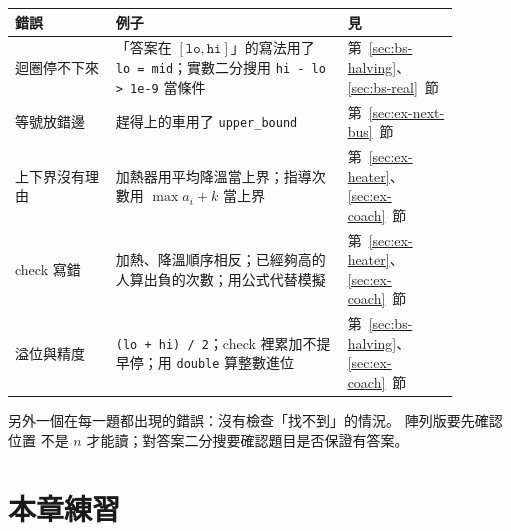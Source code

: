 \begin{center}
\begin{tabular}{p{0.2\linewidth}p{0.46\linewidth}p{0.22\linewidth}}
\toprule
錯誤 & 例子 & 見 \\
\midrule
迴圈停不下來 & 「答案在 $[\texttt{lo}, \texttt{hi}]$」的寫法用了
\texttt{lo = mid}；實數二分搜用 \texttt{hi - lo > 1e-9} 當條件 &
第~\ref{sec:bs-halving}、\ref{sec:bs-real}~節 \\
等號放錯邊 & 趕得上的車用了 \texttt{upper\_bound} & 第~\ref{sec:ex-next-bus}~節 \\
上下界沒有理由 & 加熱器用平均降溫當上界；指導次數用 $\max a_i + k$ 當上界 &
第~\ref{sec:ex-heater}、\ref{sec:ex-coach}~節 \\
check 寫錯 & 加熱、降溫順序相反；已經夠高的人算出負的次數；用公式代替模擬 &
第~\ref{sec:ex-heater}、\ref{sec:ex-coach}~節 \\
溢位與精度 & \texttt{(lo + hi) / 2}；check 裡累加不提早停；用
\texttt{double} 算整數進位 & 第~\ref{sec:bs-halving}、\ref{sec:ex-coach}~節 \\
\bottomrule
\end{tabular}
\end{center}

另外一個在每一題都出現的錯誤：沒有檢查「找不到」的情況。 陣列版要先確認位置
不是 $n$ 才能讀；對答案二分搜要確認題目是否保證有答案。

\section{本章練習}
\label{sec:ch3-exercises}

